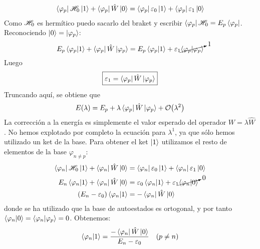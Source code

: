 \begin{equation}
  \begin{split}
    \bra{\varphi_p}  \mathscr{H} _0 \ket{1} + \bra{\varphi_p} \hat{W} \ket{0}
    = \bra{\varphi_p} \varepsilon_0 \ket{1} + \bra{\varphi_p} \varepsilon_1 \ket{0} 
  \end{split}
\end{equation}
Como $ \mathscr{H} _0$ es hermítico puedo sacarlo del braket y escribir
$ \bra{\varphi_p} \mathscr{H} _0 = E_p \bra{\varphi_p}$. Reconociendo $\ket{0}
= \ket{\varphi_p}$:
\begin{equation}
  E_p \braket{\varphi_p}{1} + \bra{\varphi_p} \hat{W} \ket{\varphi_p} = E_p
  \braket{\varphi_p}{1} + \varepsilon_1 \cancelto{1}{\braket{\varphi_p}{\varphi_p}}
\end{equation}
Luego
\begin{equation}
  \boxed{
  \varepsilon_1 = \bra{\varphi_p} \hat{W} \ket{\varphi_p}}
\end{equation}
Truncando aquí, se obtiene que
\begin{equation}
  E(\lambda) = E_p +  \lambda \bra{\varphi_p} \hat{W} \ket{\varphi_p} + \order{\lambda^2}
\end{equation}
La corrección a la energía es simplemente el valor esperado del
operador $W = \lambda \hat{W}$.
No hemos explotado por completo la ecuación para $\lambda^1$, ya que
sólo hemos utilizado un ket de la base. Para obtener el ket $\ket{1}$
utilizamos el resto de elementos de la base $\varphi_{n\neq p}$:
\begin{equation}
  \begin{split}
    \bra{\varphi_n}  \mathscr{H} _0 \ket{1} + \bra{\varphi_n} \hat{W} \ket{0}
    &= \bra{\varphi_n} \varepsilon_0 \ket{1} + \bra{\varphi_n}
    \varepsilon_1 \ket{0} \\
    E_{n}\braket{\varphi_n}{1} + \bra{\varphi_n} \hat{W} \ket{0}
    &= \varepsilon_0 \braket{\varphi_n}{1} + \varepsilon_1
    \cancelto{0 }{\braket{\varphi_n}{0}} \\
    \left(  E_{n} - \varepsilon_0 \right) \braket{\varphi_n}{1}     &=  -  \bra{\varphi_n} \hat{W} \ket{0}
  \end{split}
\end{equation}
donde se ha utilizado que la base de autoestados es ortogonal, y por
tanto $\braket{\varphi_n}{0} = \braket{\varphi_n}{\varphi_p} = 0$.
Obtenemos:
\begin{equation}
     \braket{\varphi_n}{1}=    \frac{-\bra{\varphi_n} \hat{W} \ket{0}}{
       E_n-\varepsilon_0}\ \ \ (p \neq n)
\end{equation}
